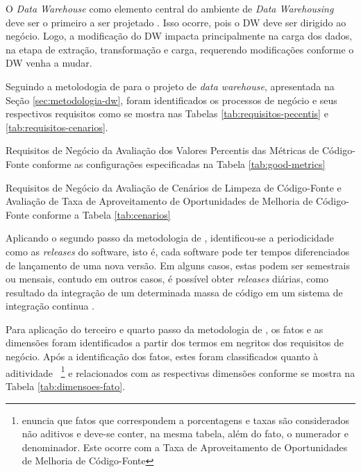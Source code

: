 O \textit{Data Warehouse} como elemento central do ambiente de \textit{Data Warehousing} deve ser o primeiro a ser projetado \cite{Kimball2002}. Isso ocorre, pois o DW deve ser dirigido ao negócio. Logo, a modificação do DW impacta principalmente na carga dos dados, na etapa de extração, transformação e carga, requerendo modificações conforme o DW venha a mudar.

Seguindo a metolodogia de  para o projeto de \textit{data warehouse}, apresentada na Seção \ref{sec:metodologia-dw}, foram identificados os processos de negócio e seus respectivos requisitos como se mostra nas Tabelas \ref{tab:requisitos-pecentis} e \ref{tab:requisitos-cenarios}. 


\begin{table}[H]
\centering

\caption{Requisitos de Negócio da Avaliação dos Valores Percentis das Métricas de Código-Fonte conforme as configurações especificadas na Tabela \ref{tab:good-metrics}}
\label{tab:requisitos-pecentis}
\end{table}
\FloatBarrier


\begin{table}[H]
\centering

\caption{Requisitos de Negócio da Avaliação de Cenários de Limpeza de Código-Fonte e Avaliação de Taxa de Aproveitamento de Oportunidades de Melhoria de Código-Fonte conforme a Tabela \ref{tab:cenarios}}
\label{tab:requisitos-cenarios}
\end{table}
\FloatBarrier


Aplicando o segundo passo da metodologia de , identificou-se a periodicidade como as \textit{releases} do software, isto é, cada software pode ter tempos diferenciados de lançamento de uma nova versão. Em alguns casos, estas podem ser semestrais ou mensais, contudo em outros casos, é possível obter \textit{releases} diárias, como resultado da integração de um determinada massa de código em um sistema de integração continua \cite{beckarticle1999}. 

Para aplicação do terceiro e quarto passo da metodologia de , os fatos e as dimensões foram identificados a partir dos termos em negritos dos requisitos de negócio. Após a identificação dos fatos, estes foram classificados quanto à aditividade~
\footnote{ enuncia que fatos que correspondem a porcentagens e taxas são considerados não aditivos e deve-se conter, na mesma tabela, além do fato, o numerador e denominador. Este ocorre com a Taxa de Aproveitamento de Oportunidades de Melhoria de Código-Fonte} e relacionados com as respectivas dimensões conforme se mostra na Tabela \ref{tab:dimensoes-fato}.



